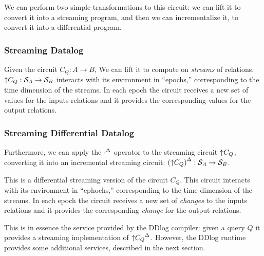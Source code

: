We can perform two simple transformations to this circuit: we can lift it to convert it
into a streaming program, and then we can incrementalize it, to convert it into a
differential program.

\subsubsection{Streaming Datalog}

Given the circuit $C_Q: A \to B$, We can lift it to compute on \emph{streams} 
of relations.  ${\uparrow}C_Q: \mathcal{S}_{A} \to \mathcal{S}_{B}$ interacts with its environment 
in ``epochs,'' corresponding to the time dimension of the streams.  In each epoch the circuit
receives a new set of values for the inputs relations and it provides the corresponding values
for the output relations.


\subsubsection{Streaming Differential Datalog}

Furthermore, we can apply the ${\cdot}^{\Delta}$ operator to the streaming circuit ${\uparrow}C_Q$, 
converting it into an incremental streaming circuit: ${({\uparrow}C_Q)}^{\Delta}: \mathcal{S}_{A} \to \mathcal{S}_{B}$.


This is a differential streaming version of the circuit $C_Q$.  This circuit
interacts with its environment in ``ephochs,'' corresponding to the time dimension of the streams.  
In each epoch the circuit receives a new set of \emph{changes} to the inputs relations and it
provides the corresponding \emph{change} for the output relations.

This is in essence the service provided by the DDlog compiler: given a query $Q$
it provides a streaming implementation of ${{\uparrow}C_Q}^{\Delta}$.  However, the DDlog
runtime provides some additional services, described in the next section.

